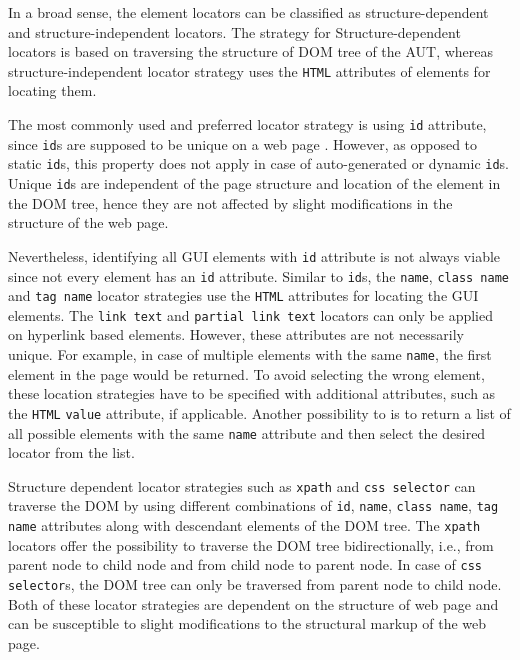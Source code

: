 In a broad sense, the element locators can be classified as structure-dependent and structure-independent locators. The strategy for Structure-dependent locators is based on traversing the structure of DOM tree of the AUT, whereas structure-independent locator strategy uses the \texttt{HTML} attributes of elements for locating them. 

The most commonly used and preferred locator strategy is using \texttt{id} attribute, since \texttt{id}s are supposed to be unique on a web page \cite{W3CIDs}. However, as opposed to static \texttt{id}s, this property does not apply in case of auto-generated or dynamic \texttt{id}s. Unique \texttt{id}s are independent of the page structure and location of the element in the DOM tree, hence they are not affected by slight modifications in the structure of the web page. 

Nevertheless, identifying all GUI elements with \texttt{id} attribute is not always viable since not every element has an \texttt{id} attribute. Similar to \texttt{id}s, the \texttt{name}, \texttt{class name} and \texttt{tag name} locator strategies use the \texttt{HTML} attributes for locating the GUI elements. 
The \texttt{link text} and  \texttt{partial link text} locators can only be applied on hyperlink based elements. However, these attributes are not necessarily unique. For example, in case of multiple elements with the same \texttt{name}, the first element in the page would be returned. To avoid selecting the wrong element, these location strategies have to be specified with additional attributes, such as the \texttt{HTML} \texttt{value} attribute, if applicable. Another possibility to is to return a list of all possible elements with the same \texttt{name} attribute and then select the desired locator from the list. 

Structure dependent locator strategies such as \texttt{xpath} and \texttt{css selector} can traverse the DOM by using different combinations of \texttt{id}, \texttt{name}, \texttt{class name}, \texttt{tag name} attributes along with descendant elements of the DOM tree. The \texttt{xpath} locators offer the possibility to traverse the DOM tree bidirectionally, i.e., from parent node to child node and from child node to parent node. In case of \texttt{css selector}s, the DOM tree can only be traversed from parent node to child node. Both of these locator strategies are dependent on the structure of web page and can be susceptible to slight modifications to the structural markup of the web page.  
 
